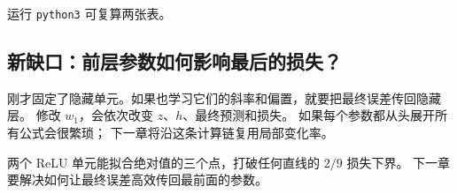 运行 \texttt{python3}  可复算两张表。

\subsection{新缺口：前层参数如何影响最后的损失？}

刚才固定了隐藏单元。如果也学习它们的斜率和偏置，就要把最终误差传回隐藏层。
修改 $w_1$，会依次改变 $z$、$h$、最终预测和损失。
如果每个参数都从头展开所有公式会很繁琐；
下一章将沿这条计算链复用局部变化率。



\par\smallskip
两个 ReLU 单元能拟合绝对值的三个点，打破任何直线的 $2/9$ 损失下界。
下一章要解决如何让最终误差高效传回最前面的参数。\label{route:relu-end}

